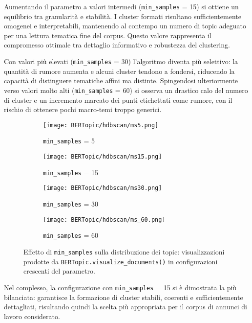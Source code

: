 Aumentando il parametro a valori intermedi (\texttt{min\_samples} = 15) si ottiene un equilibrio tra granularità e stabilità. 
I cluster formati risultano sufficientemente omogenei e interpretabili, mantenendo al contempo un numero di topic adeguato per una lettura tematica fine del corpus. 
Questo valore rappresenta il compromesso ottimale tra dettaglio informativo e robustezza del clustering.

Con valori più elevati (\texttt{min\_samples} = 30) l’algoritmo diventa più selettivo: la quantità di rumore aumenta e alcuni cluster tendono a fondersi, riducendo la capacità di distinguere tematiche affini ma distinte. 
Spingendosi ulteriormente verso valori molto alti (\texttt{min\_samples} = 60) si osserva un drastico calo del numero di cluster e un incremento marcato dei punti etichettati come rumore, con il rischio di ottenere pochi macro-temi troppo generici.

\begin{figure}[H]
\centering
\begin{subfigure}{0.24\textwidth}
    \centering
    \texttt{[image: BERTopic/hdbscan/ms5.png]}
    \caption{\texttt{min\_samples} = 5}
\end{subfigure}\hfill
\begin{subfigure}{0.24\textwidth}
    \centering
    \texttt{[image: BERTopic/hdbscan/ms15.png]}
    \caption{\texttt{min\_samples} = 15}
\end{subfigure}\hfill
\begin{subfigure}{0.24\textwidth}
    \centering
    \texttt{[image: BERTopic/hdbscan/ms30.png]}
    \caption{\texttt{min\_samples} = 30}
\end{subfigure}\hfill
\begin{subfigure}{0.24\textwidth}
    \centering
    \texttt{[image: BERTopic/hdbscan/ms\_60.png]}
    \caption{\texttt{min\_samples} = 60}
\end{subfigure}
\caption{Effetto di \texttt{min\_samples} sulla distribuzione dei topic: visualizzazioni prodotte da \texttt{BERTopic.visualize\_documents()} in configurazioni crescenti del parametro.}
\label{fig:min-samples-umap}
\end{figure}

Nel complesso, la configurazione con \texttt{min\_samples} = 15 si è dimostrata la più bilanciata: 
garantisce la formazione di cluster stabili, coerenti e sufficientemente dettagliati, risultando quindi la scelta più appropriata per il corpus di annunci di lavoro considerato.

